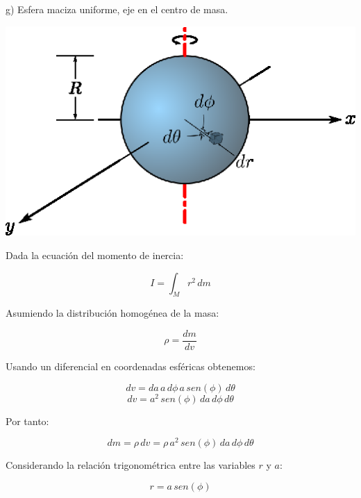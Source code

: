 \documentclass[letter,11pt]{article}
\begin{document}
\newpage
g) Esfera maciza uniforme, eje en el centro de masa.

\begin{center}
\includegraphics[scale=1.75]{resources/f7.eps}
\end{center}

Dada la ecuación del momento de inercia:

\begin{equation}
    I = \int_{M} r^2\, dm
\label{momentodeinercia7}
\end{equation}

Asumiendo la distribución homogénea de la masa:

\begin{equation*}
    \rho = \frac{dm}{dv}
\end{equation*}

Usando un diferencial en coordenadas esféricas obtenemos:

\begin{equation*}
    dv = da\, a\, d\phi\, a\, sen (\phi)\, d\theta
\end{equation*}
\begin{equation*}
    dv = a^2\, sen (\phi)\, da\, d\phi\, d\theta
\end{equation*}

Por tanto:

\begin{equation}
    dm = \rho\, dv = \rho\, a^2\, sen (\phi)\, da\, d\phi\, d\theta
\label{dm7}
\end{equation}

Considerando la relación trigonométrica entre las variables $r$ y $a$:

\begin{equation}
    r = a\, sen (\phi)
\label{distancia7}
\end{equation}
\end{document}

